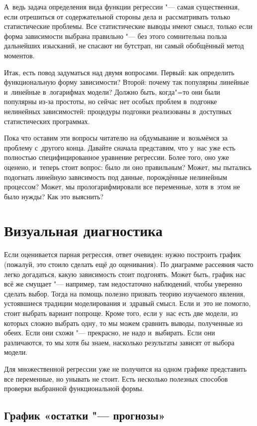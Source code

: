 \documentclass[final,pdftex]{../../template/epsilonj}
\begin{document}
А~ведь задача определения вида функции регрессии "--- самая существенная, если отрешиться от содержательной стороны дела и~рассматривать только статистические проблемы. Все статистические выводы имеют смысл, только если форма зависимости выбрана правильно "--- без этого сомнительна польза дальнейших изысканий, не спасают ни бутстрап, ни самый обобщённый метод моментов.

Итак, есть повод задуматься над двумя вопросами. Первый: как определить функциональную форму зависимости? Второй: почему так популярны линейные и~линейные в~логарифмах модели? Должно быть, когда"=то они были популярны из-за простоты, но сейчас нет особых проблем в~подгонке нелинейных зависимостей: процедуры подгонки реализованы в~доступных статистических программах.

Пока что оставим эти вопросы читателю на обдумывание и~возьмёмся за проблему с~другого конца. Давайте сначала представим, что у~нас уже есть полностью специфицированное уравнение регрессии. Более того, оно уже оценено, и~теперь стоит вопрос: было ли оно правильным? Может, мы пытались подогнать линейную зависимость под данные, порождённые нелинейным процессом? Может, мы прологарифмировали все переменные, хотя в~этом не было нужды? Как это выяснить?

\section{Визуальная диагностика}

Если оценивается парная регрессия, ответ очевиден: нужно построить график (пожалуй, это стоило сделать ещё до оценивания). По диаграмме рассеяния часто легко догадаться, какую зависимость стоит подгонять. Может быть, график нас всё же смущает "--- например, там недостаточно наблюдений, чтобы уверенно сделать выбор. Тогда на помощь полезно призвать теорию изучаемого явления, устоявшиеся традиции моделирования и~здравый смысл. Если и~это не помогло, стоит выбрать вариант попроще. Кроме того, если у~нас есть две модели, из которых сложно выбрать одну, то мы можем сравнить выводы, полученные из обеих. Если они схожи "--- прекрасно, не надо и~выбирать. Если они различаются, то мы хотя бы знаем, насколько результаты зависят от выбора модели.

Для множественной регрессии уже не получится на одном графике представить все переменные, но унывать не стоит. Есть несколько полезных способов проверки выбранной функциональной формы.

\subsection{График «остатки "--- прогнозы»}
\end{document}
